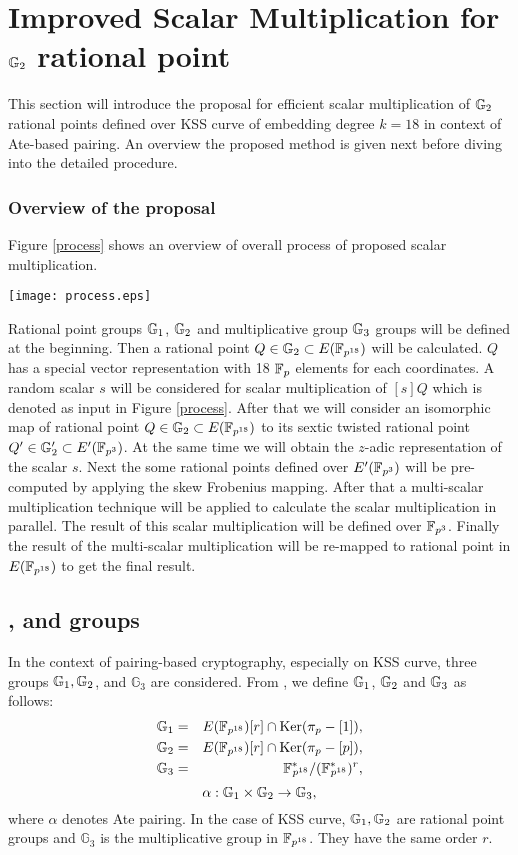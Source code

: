 \section{Improved Scalar Multiplication for ${\mathbb{G}}_{2}$ rational point}
This section will introduce the proposal for efficient scalar multiplication of ${\mathbb{G}}_{2}$ rational points defined over KSS curve of embedding degree $k=18$ in context of Ate-based pairing. 
An overview the proposed method is given next before diving into the detailed procedure.
\subsubsection{Overview of the proposal} 
Figure \ref{process} shows an overview of overall process of proposed scalar multiplication.
\begin{figure*}[ht]
\centering
\texttt{[image: process.eps]}
\caption{Overview of the proposed scalar multiplication.}
\label{process}
\end{figure*}
Rational point groups ${\mathbb{G}}_{1}$, ${\mathbb{G}}_{2}$ and multiplicative group ${\mathbb{G}}_{3}$ groups will be defined at the beginning. Then a rational point $Q\in {\mathbb{G}}_{2} \subset E({\mathbb{F}}_{p^{18}})$ will be calculated.
$Q$ has a  special vector representation with 18 ${\mathbb{F}}_{p}$ elements for each coordinates. 
A random scalar $s$ will be considered for scalar multiplication of $[s]Q$ which is denoted as input in  Figure \ref{process}. After that we will consider an isomorphic map of rational point $Q\in {\mathbb{G}}_{2} \subset E({\mathbb{F}}_{p^{18}})$ to its sextic twisted rational point $Q' \in {\mathbb{G}}_{2}' \subset E'({\mathbb{F}}_{p^{3}})$. At the same time we will obtain the $z$-adic  representation of the scalar $s$. Next the some rational points defined over $E'(\mathbb{F}_{p^3})$ will be pre-computed by applying the skew Frobenius mapping. After that a multi-scalar multiplication technique will be applied to calculate the scalar multiplication in parallel. The result of this scalar multiplication will be defined over $\mathbb{F}_{p^3}$. Finally the result of the multi-scalar multiplication will be re-mapped to rational point in $E(\mathbb{F}_{p^{18}})$ to get the final result.

\subsection{,  and  groups} In the context of pairing-based cryptography, especially on KSS curve, three groups ${\mathbb{G}}_{1}, {\mathbb{G}}_{2}$, and $\mathbb{G}_3$ are considered. From \cite{mori}, we define ${\mathbb{G}}_{1}$, ${\mathbb{G}}_{2}$ and ${\mathbb{G}}_{3}$ as follows:
\begin{eqnarray}\label{eq:g1}
{\mathbb{G}}_{1} & = &  E({\mathbb{F}}_{p^{18}}) [r] \cap \text{Ker}(\pi_p - [1]), \nonumber \\
{\mathbb{G}}_{2} & = &  E({\mathbb{F}}_{p^{18}}) [r] \cap \text{Ker}(\pi_p - [p]), \nonumber \\
{\mathbb{G}}_{3} & = & {{\mathbb{F}}^{\ast}}_{\!\!\!p^{18}}/({{\mathbb{F}}^{\ast}}_{\!\!\!p^{18}})^r, \nonumber
\end{eqnarray}
\begin{equation}
\alpha : {\mathbb{G}}_{1} \times {\mathbb{G}}_{2} \rightarrow {\mathbb{G}}_{3},
\end{equation}
where $\alpha$ denotes Ate pairing. In the case of KSS curve, ${\mathbb{G}}_{1}, {\mathbb{G}}_{2}$ are rational point groups and $\mathbb{G}_3$ is the multiplicative group in $\mathbb{F}_{p^{18}}$. They have the same order $r$. 

